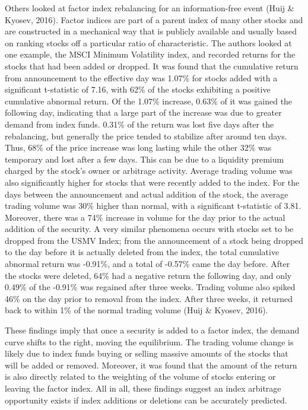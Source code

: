 \documentclass[12pt,twoside]{reedthesis}
\theoremstyle{definition}
\theoremstyle{definition}
\theoremstyle{definition}
\theoremstyle{remark}
\begin{document}
Others looked at factor index rebalancing for an information-free event
(Huij \& Kyosev, 2016). Factor indices are part of a parent index of
many other stocks and are constructed in a mechanical way that is
publicly available and usually based on ranking stocks off a particular
ratio of characteristic. The authors looked at one example, the MSCI
Minimum Volatility index, and recorded returns for the stocks that had
been added or dropped. It was found that the cumulative return from
announcement to the effective day was 1.07\% for stocks added with a
significant t-statistic of 7.16, with 62\% of the stocks exhibiting a
positive cumulative abnormal return. Of the 1.07\% increase, 0.63\% of
it was gained the following day, indicating that a large part of the
increase was due to greater demand from index funds. 0.31\% of the
return was lost five days after the rebalancing, but generally the price
tended to stabilize after around ten days. Thus, 68\% of the price
increase was long lasting while the other 32\% was temporary and lost
after a few days. This can be due to a liquidity premium charged by the
stock's owner or arbitrage activity. Average trading volume was also
significantly higher for stocks that were recently added to the index.
For the days between the announcement and actual addition of the stock,
the average trading volume was 30\% higher than normal, with a
significant t-statistic of 3.81. Moreover, there was a 74\% increase in
volume for the day prior to the actual addition of the security. A very
similar phenomena occurs with stocks set to be dropped from the USMV
Index; from the announcement of a stock being dropped to the day before
it is actually deleted from the index, the total cumulative abnormal
return was -0.91\%, and a total of -0.57\% came the day before. After
the stocks were deleted, 64\% had a negative return the following day,
and only 0.49\% of the -0.91\% was regained after three weeks. Trading
volume also spiked 46\% on the day prior to removal from the index.
After three weeks, it returned back to within 1\% of the normal trading
volume (Huij \& Kyosev, 2016).

These findings imply that once a security is added to a factor index,
the demand curve shifts to the right, moving the equilibrium. The
trading volume change is likely due to index funds buying or selling
massive amounts of the stocks that will be added or removed. Moreover,
it was found that the amount of the return is also directly related to
the weighting of the volume of stocks entering or leaving the factor
index. All in all, these findings suggest an index arbitrage opportunity
exists if index additions or deletions can be accurately predicted.
\end{document}
